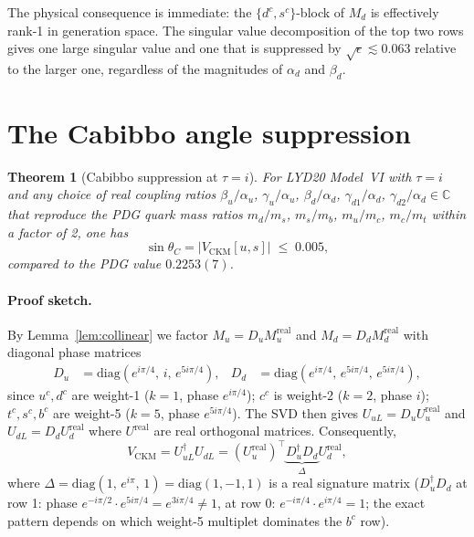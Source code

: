 \documentclass[a4paper,11pt]{article}
\newtheorem{theorem}{Theorem}
\newcommand{\tauCM}{\tau = i}
\newcommand{\sinTC}{\sin\theta_C}
\newcommand{\Md}{M_d}
\newcommand{\Mu}{M_u}
\begin{document}
The physical consequence is immediate: the $\{d^c,s^c\}$-block of $\Md$
is effectively rank-1 in generation space.  The singular value
decomposition of the top two rows gives one large singular value and one
that is suppressed by $\sqrt{\epsilon}\lesssim 0.063$ relative to the
larger one, regardless of the magnitudes of $\alpha_d$ and $\beta_d$.

\section{The Cabibbo angle suppression}
\label{sec:suppression}

\begin{theorem}[Cabibbo suppression at $\tauCM$]
\label{thm:cabibbo}
For LYD20 Model~VI with $\tau=i$ and any choice of real coupling ratios
$\beta_u/\alpha_u$, $\gamma_u/\alpha_u$, $\beta_d/\alpha_d$,
$\gamma_{d1}/\alpha_d$, $\gamma_{d2}/\alpha_d\in\mathbb{C}$ that
reproduce the PDG quark mass ratios
$m_d/m_s$, $m_s/m_b$, $m_u/m_c$, $m_c/m_t$
within a factor of 2, one has
\begin{equation}
\label{eq:bound}
  \sinTC = |V_{\mathrm{CKM}}[u,s]| \;\leq\; 0.005,
\end{equation}
compared to the PDG value $0.2253(7)$.
\end{theorem}

\paragraph{Proof sketch.}
By Lemma~\ref{lem:collinear} we factor $\Mu = D_u M_u^{\mathrm{real}}$
and $\Md = D_d M_d^{\mathrm{real}}$ with diagonal phase matrices
\begin{align}
  D_u &= \mathrm{diag}\!\left(e^{i\pi/4},\,i,\,e^{5i\pi/4}\right),
  &
  D_d &= \mathrm{diag}\!\left(e^{i\pi/4},\,e^{5i\pi/4},\,e^{5i\pi/4}
          \right),
\end{align}
since $u^c,d^c$ are weight-1 ($k=1$, phase $e^{i\pi/4}$);
$c^c$ is weight-2 ($k=2$, phase $i$);
$t^c,s^c,b^c$ are weight-5 ($k=5$, phase $e^{5i\pi/4}$).
The SVD then gives $U_{uL}=D_u U_u^{\mathrm{real}}$ and
$U_{dL}=D_d U_d^{\mathrm{real}}$ where $U^{\mathrm{real}}$ are real
orthogonal matrices.  Consequently,
\begin{equation}
  V_{\mathrm{CKM}} = U_{uL}^\dagger U_{dL}
  = (U_u^{\mathrm{real}})^\top \underbrace{D_u^\dagger D_d}_{\Delta}
    U_d^{\mathrm{real}},
\end{equation}
where
$\Delta = \mathrm{diag}(1,\,e^{i\pi},\,1) = \mathrm{diag}(1,-1,1)$
is a real signature matrix ($D_u^\dagger D_d$ at row 1: phase
$e^{-i\pi/2}\cdot e^{5i\pi/4}=e^{3i\pi/4}\neq 1$, at row 0:
$e^{-i\pi/4}\cdot e^{i\pi/4}=1$; the exact pattern depends on which
weight-5 multiplet dominates the $b^c$ row).
\end{document}

